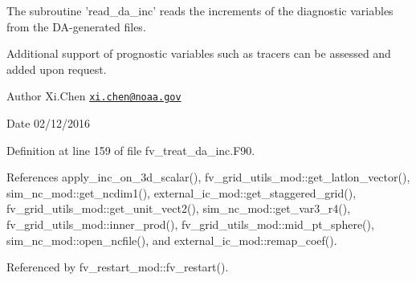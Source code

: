 The subroutine 'read\-\_\-da\-\_\-inc' reads the increments of the diagnostic variables from the D\-A-\/generated files. 

Additional support of prognostic variables such as tracers can be assessed and added upon request. \begin{DoxyAuthor}{Author}
Xi.\-Chen \href{mailto:xi.chen@noaa.gov}{\tt xi.\-chen@noaa.\-gov} 
\end{DoxyAuthor}
\begin{DoxyDate}{Date}
02/12/2016 
\end{DoxyDate}


Definition at line 159 of file fv\-\_\-treat\-\_\-da\-\_\-inc.\-F90.



References apply\-\_\-inc\-\_\-on\-\_\-3d\-\_\-scalar(), fv\-\_\-grid\-\_\-utils\-\_\-mod\-::get\-\_\-latlon\-\_\-vector(), sim\-\_\-nc\-\_\-mod\-::get\-\_\-ncdim1(), external\-\_\-ic\-\_\-mod\-::get\-\_\-staggered\-\_\-grid(), fv\-\_\-grid\-\_\-utils\-\_\-mod\-::get\-\_\-unit\-\_\-vect2(), sim\-\_\-nc\-\_\-mod\-::get\-\_\-var3\-\_\-r4(), fv\-\_\-grid\-\_\-utils\-\_\-mod\-::inner\-\_\-prod(), fv\-\_\-grid\-\_\-utils\-\_\-mod\-::mid\-\_\-pt\-\_\-sphere(), sim\-\_\-nc\-\_\-mod\-::open\-\_\-ncfile(), and external\-\_\-ic\-\_\-mod\-::remap\-\_\-coef().



Referenced by fv\-\_\-restart\-\_\-mod\-::fv\-\_\-restart().

